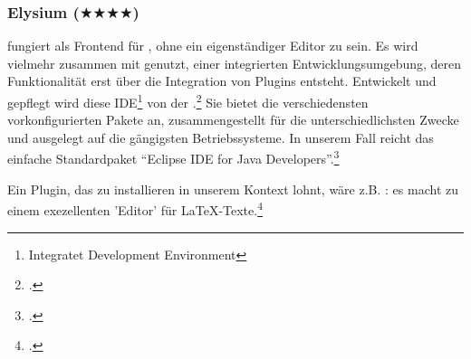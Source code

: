 %
%
%



\subsubsection{Elysium ($\bigstar\bigstar\bigstar\bigstar$)}

\label{Elysium} fungiert als Frontend für , ohne ein
eigenständiger Editor zu sein. Es wird vielmehr zusammen mit 
genutzt, einer integrierten Entwicklungsumgebung, deren Funktionalität erst über
die Integration von Plugins entsteht. Entwickelt und gepflegt wird diese
IDE\footnote{Integratet Development Environment} von der .\footcite[vgl.][\nopage wp]{Eclipse2018a} Sie bietet die
verschiedensten vorkonfigurierten Pakete an, zusammengestellt für die
unterschiedlichsten Zwecke und ausgelegt auf die gängigsten Betriebssysteme. In
unserem Fall reicht das einfache Standardpaket \enquote{Eclipse IDE for Java
Developers}.\footcite[vgl.][\nopage wp]{Eclipse2018b}

Ein Plugin, das zu installieren in unserem Kontext lohnt, wäre z.B.
: es macht  zu einem exezellenten 'Editor' für
\LaTeX-Texte.\footcite[vgl.][\nopage wp]{TeXlipse2019a}

